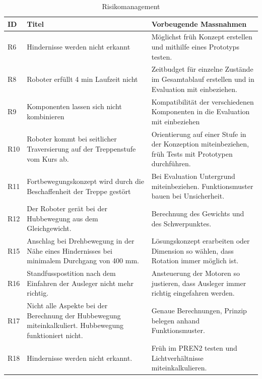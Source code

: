 \begin{center}
\begin{table}[H]
    \begin{tabularx}{\textwidth}{|l|X|X|}
        \hline
        \textbf{ID} & \textbf{Titel} & \textbf{Vorbeugende Massnahmen} \\ \hline
        R6 & Hindernisse werden nicht erkannt & Möglichst früh Konzept erstellen und mithilfe eines Prototyps testen. \\ \hline
        R8 & Roboter erfüllt 4 min Laufzeit nicht & Zeitbudget für einzelne Zustände im Gesamtablauf erstellen und in Evaluation mit einbeziehen. \\ \hline
        R9 & Komponenten lassen sich nicht kombinieren & Kompatibilität der verschiedenen Komponenten in die Evaluation mit einbeziehen \\ \hline
        R10 & Roboter kommt bei seitlicher Traversierung auf der Treppenstufe vom Kurs ab.& Orientierung auf einer Stufe in der Konzeption miteinbeziehen, früh Tests mit Prototypen durchführen.\\ \hline
        R11 & Fortbewegungskonzept wird durch die Beschaffenheit der Treppe gestört & Bei Evaluation Untergrund miteinbeziehen. Funktionsmuster bauen bei Unsicherheit. \\ \hline
        R12 & Der Roboter gerät bei der Hubbewegung aus dem Gleichgewicht. & Berechnung des Gewichts und des Schwerpunktes.\\ \hline
        R15 & Anschlag bei Drehbewegung in der Nähe eines Hindernisses bei minimalem Durchgang von 400 mm. & Lösungskonzept erarbeiten oder Dimension so wählen, dass Rotation immer möglich ist. \\ \hline
        R16 & Standfusspostition nach dem Einfahren der Ausleger nicht mehr richtig. & Ansteuerung der Motoren so justieren, dass Ausleger immer richtig eingefahren werden. \\ \hline
        R17 & Nicht alle Aspekte bei der Berechnung der Hubbewegung miteinkalkuliert. Hubbewegung funktioniert nicht. & Genaue Berechnungen, Prinzip belegen anhand Funktionsmuster.\\ \hline
        R18 & Hindernisse werden nicht erkannt. & Früh im PREN2 testen und Lichtverhältnisse miteinkalkulieren.\\ \hline
    \end{tabularx}
    \caption{Risikomanagement}
    \label{tab:risikomanagement}
\end{table}
\end{center}

